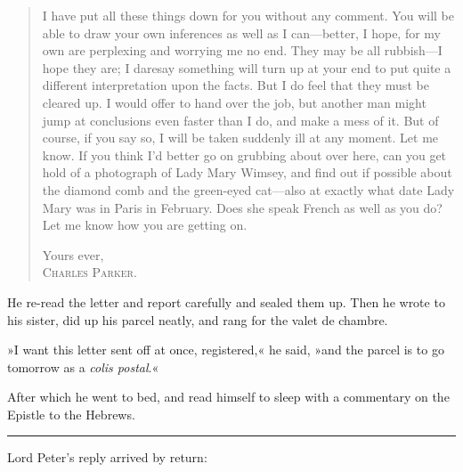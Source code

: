 \begin{quote}

I have put all these things down for you without any comment. You will be able to draw your own inferences as well as I can—better, I hope, for my own are perplexing and worrying me no end. They may be all rubbish—I hope they are; I daresay something will turn up at your end to put quite a different interpretation upon the facts. But I do feel that they must be cleared up. I would offer to hand over the job, but another man might jump at conclusions even faster than I do, and make a mess of it. But of course, if you say so, I will be taken suddenly ill at any moment. Let me know. If you think I'd better go on grubbing about over here, can you get hold of a photograph of Lady Mary Wimsey, and find out if possible about the diamond comb and the green-eyed cat—also at exactly what date Lady Mary was in Paris in February. Does she speak French as well as you do? Let me know how you are getting on.

\begin{flushright}
Yours ever,\\
\textsc{Charles Parker.}
\end{flushright}
\end{quote}


He re-read the letter and report carefully and sealed them up. Then he wrote to his sister, did up his parcel neatly, and rang for the valet de chambre.

»I want this letter sent off at once, registered,« he said, »and the parcel is to go tomorrow as a \textit{colis postal}.«

After which he went to bed, and read himself to sleep with a commentary on the Epistle to the Hebrews.

\noindent\hfil\rule{0.5\textwidth}{.4pt}\hfil

Lord Peter's reply arrived by return:


